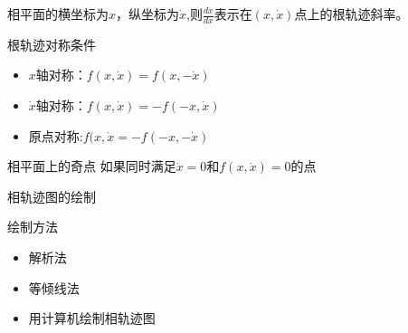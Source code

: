 \begin{frame}
\begin{block}{}
相平面的横坐标为$x$，纵坐标为$\dot{x}$,则$\frac{d\dot{x}}{dx}$表示在$(x,\dot{x})$点上的根轨迹斜率。
\end{block}
\begin{block}{根轨迹对称条件}
\begin{itemize}
\item $x$轴对称：$f(x,\dot{x})=f(x,-\dot{x})$
\item $\dot{x}$轴对称：$f(x,\dot{x})=-f(-x,\dot{x})$
\item 原点对称:$f(x,\dot{x}=-f(-x,-\dot{x})$
\end{itemize}
\end{block}
\begin{block}{相平面上的奇点}
如果同时满足$\dot{x}=0$和$f(x,\dot{x})=0$的点
\end{block}
\end{frame}

\begin{frame}{相轨迹图的绘制}
\begin{block}{绘制方法}
\begin{itemize}
\item 解析法
\item 等倾线法
\item 用计算机绘制相轨迹图
\end{itemize}
\end{block}
\end{frame}

